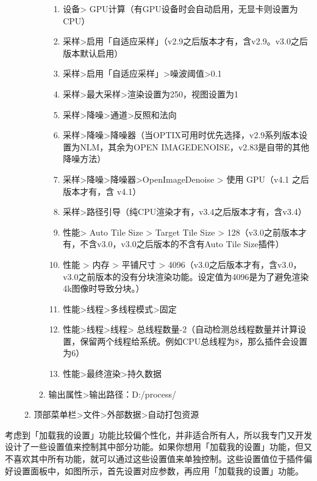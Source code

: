 \documentclass{../../public_resources/doc}
\begin{document}
\begin{enumerate}
\begin{enumerate}
\begin{enumerate}
\begin{enumerate}
                \item 设备> GPU计算（有GPU设备时会自动启用，无显卡则设置为CPU）
                \item 采样>启用「自适应采样」（v2.9之后版本才有，含v2.9。v3.0之后版本默认启用）
                \item 采样>启用「自适应采样」>噪波阈值>0.1
                \item 采样>最大采样>渲染设置为250，视图设置为1
                \item 采样>降噪>通道>反照和法向
                \item 采样>降噪>降噪器（当OPTIX可用时优先选择，v2.9系列版本设置为NLM，其余为OPEN IMAGEDENOISE，v2.83是自带的其他降噪方法）
                \item 采样>降噪>降噪器>OpenImageDenoise > 使用 GPU（v4.1 之后版本才有，含 v4.1）
                \item 采样>路径引导（纯CPU渲染才有，v3.4之后版本才有，含v3.4）
                \item 性能> Auto Tile Size > Target Tile Size > 128（v3.0之前版本才有，不含v3.0，v3.0之后版本的不含有Auto Tile Size插件）
                \item 性能 > 内存  > 平铺尺寸 > 4096（v3.0之后版本才有，含v3.0，v3.0之前版本的没有分块渲染功能。设定值为4096是为了避免渲染4k图像时导致分块。）
                \item 性能>线程>多线程模式>固定
                \item 性能>线程>线程> 总线程数量-2（自动检测总线程数量并计算设置，保留两个线程给系统。例如CPU总线程为8，那么插件会设置为6）
                \item 性能>最终渲染>持久数据
            \end{enumerate}
            \item 输出属性>输出路径：D:/process/
        \end{enumerate}
        \item 顶部菜单栏>文件>外部数据>自动打包资源
    \end{enumerate}
\end{enumerate}

考虑到「加载我的设置」功能比较偏个性化，并非适合所有人，所以我专门又开发设计了一些设置值来控制其中部分功能。如果你想用「加载我的设置」功能，但又不喜欢其中所有功能，就可以通过这些设置值来单独控制。这些设置值位于插件偏好设置面板中，如图所示，首先设置对应参数，再应用「加载我的设置」功能。
\end{document}
